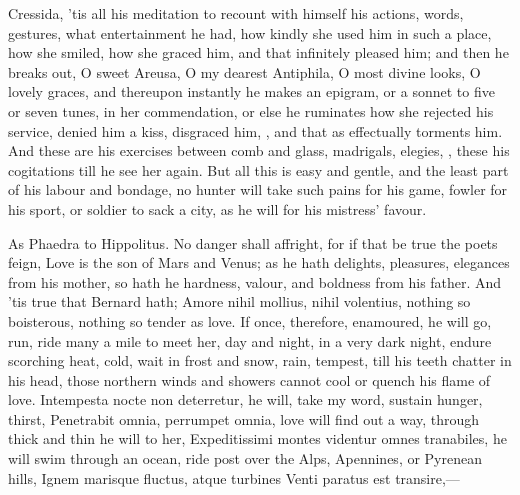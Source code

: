 Cressida, 'tis all his meditation to recount with himself his actions,
words, gestures, what entertainment he had, how kindly she used him in
such a place, how she smiled, how she graced him, and that infinitely
pleased him; and then he breaks out, O sweet Areusa, O my dearest
Antiphila, O most divine looks, O lovely graces, and thereupon
instantly he makes an epigram, or a sonnet to five or seven tunes, in
her commendation, or else he ruminates how she rejected his service,
denied him a kiss, disgraced him, \etc{}, and that as effectually torments
him. And these are his exercises between comb and glass, madrigals,
elegies, \etc{}, these his cogitations till he see her again. But all this
is easy and gentle, and the least part of his labour and bondage, no
hunter will take such pains for his game, fowler for his sport, or
soldier to sack a city, as he will for his mistress' favour.

As Phaedra to Hippolitus. No danger shall affright, for if that be true
the poets feign, Love is the son of Mars and Venus; as he hath
delights, pleasures, elegances from his mother, so hath he hardness,
valour, and boldness from his father. And 'tis true that Bernard hath;
Amore nihil mollius, nihil volentius, nothing so boisterous, nothing so
tender as love. If once, therefore, enamoured, he will go, run, ride
many a mile to meet her, day and night, in a very dark night, endure
scorching heat, cold, wait in frost and snow, rain, tempest, till his
teeth chatter in his head, those northern winds and showers cannot cool
or quench his flame of love. Intempesta nocte non deterretur, he will,
take my word, sustain hunger, thirst, Penetrabit omnia, perrumpet
omnia, love will find out a way, through thick and thin he will to her,
Expeditissimi montes videntur omnes tranabiles, he will swim through an
ocean, ride post over the Alps, Apennines, or Pyrenean hills,
Ignem marisque fluctus, atque turbines
Venti paratus est transire,---

